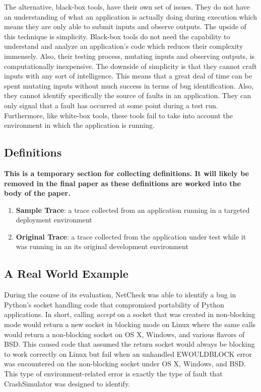         The alternative, black-box tools, have their own set of issues. They do not have an understanding of what an
        application is actually doing during execution which means they are only able to submit inputs and observe
        outputs.  The upside of this technique is simplicity. Black-box tools do not need the capability to understand
        and analyze an application's code which reduces their complexity immensely. Also, their testing process,
        mutating inputs and observing outputs, is computationally inexpensive. The downside of simplicity is that they
        cannot craft inputs with any sort of intelligence. This means that a great deal of time can be spent mutating
        inputs without much success in terms of bug identification. Also, they cannot identify specifically the source
        of faults in an application. They can only signal that a fault has occurred at some point during a test run.
        Furthermore, like white-box tools, these tools fail to take into account the environment in which the
        application is running.

    \subsection{Definitions}
        \textbf{This is a temporary section for collecting definitions. It will likely be removed in the final paper as
        these definitions are worked into the body of the paper.}
        \begin{enumerate}
            \item{\textbf{Sample Trace}: a trace collected from an application running in a targeted deployment
                environment}
            \item{\textbf{Original Trace}: a trace collected from the application under test while it was running in an
                its original development environment}
        \end{enumerate}

    \subsection{A Real World Example}

        During the course of its evaluation, NetCheck was able to identify a bug in Python's socket handling code that
        compromised portability of Python applications. In short, calling \emph{accept} on a socket that was created in
        non-blocking mode would return a new socket in blocking mode on Linux where the same calls would return a
        non-blocking socket on OS X, Windows, and various flavors of BSD\@. This caused code that assumed the return
        socket would always be blocking to work correctly on Linux but fail when an unhandled EWOULDBLOCK error was
        encountered on the non-blocking socket under OS X, Windows, and BSD\@. This type of environment-related error is
        exactly the type of fault that CrashSimulator was designed to identify.


